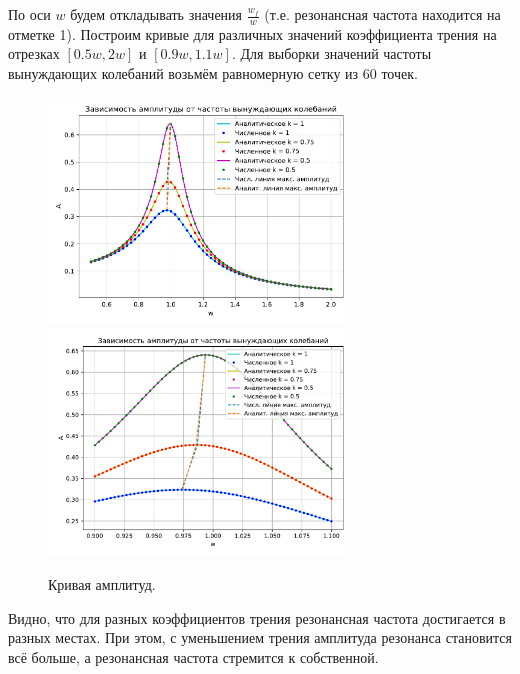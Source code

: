             По оси \( w \) будем откладывать значения \( \frac{w_f}{w} \) (т.е. резонансная частота находится на отметке 1). Построим кривые для различных значений коэффициента трения на отрезках \( [0.5 w, 2 w] \) и \( [0.9 w, 1.1 w] \). Для выборки значений частоты вынуждающих колебаний возьмём равномерную сетку из 60 точек. 

            \begin{figure}[H]
                \centering
                \includegraphics[width=8cm]{pictures/6res05_20.pdf}
                \includegraphics[width=8cm]{pictures/6res09_11.pdf}
                \caption{Кривая амплитуд.}
            \end{figure}
            Видно, что для разных коэффициентов трения резонансная частота достигается в разных местах. При этом, с уменьшением трения амплитуда резонанса становится всё больше, а резонансная частота стремится к собственной.
            